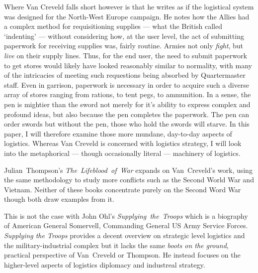 \documentclass[noraggedright]{turabian-researchpaper}
\begin{document}
Where Van Creveld falls short however is that he writes as if the logistical 
system was designed for the North-West Europe campaign.  He notes how the 
Allies had a complex method for requisitioning supplies --- what the British
called `indenting' --- without considering how, at the user level, the act of 
submitting paperwork for receiving supplies was, fairly routine.\autocite
[208-9]{sup-war} %
Armies not only \textit{fight}, but \textit{live} on their supply lines.  
Thus, for the end user, the need to submit paperwork to get stores would 
likely have looked reasonably similar to normality, with many of the 
intricacies of meeting such requestions being absorbed by Quartermaster staff.
Even in garrison, paperwork is necessary in order to acquire such a diverse 
array of stores ranging from rations, to tent pegs, to ammunition.  In a sense,
the pen is mightier than the sword not merely for it's ability to express 
complex and profound ideas, but also because the pen completes the paperwork. 
The pen can order swords but without the pen, those who hold the swords will 
starve.  In this paper, I will therefore examine those more mundane, day-to-day
aspects of logistics.  Whereas Van Creveld is concerned with logistics 
strategy, I will look into the metaphorical --- though occasionally literal --- 
machinery of logistics.

\mbox{Julian Thompson's} \mbox{\textit{The Lifeblood of War}} expands on 
\mbox{Van Creveld's} work, using the same methodology to study more conflicts 
such as the Second World War %
and Vietnam.  Neither of these books concentrate purely on the Second Word
War though both draw examples from it.  

This is not the case with John Ohl's \mbox{\textit{Supplying the Troops}} 
which is a biography of American General Somervell, Commanding General US
Army Service Forces.  \textit{Supplying the Troops} provides a decent 
overview on strategic level logistics and the military-industrial complex but 
it lacks the same \textit{boots on the ground}, practical perspective of 
\mbox {Van Creveld} or Thompson. He instead focuses on the higher-level 
aspects of logistics diplomacy and industreal strategy.
\end{document}
